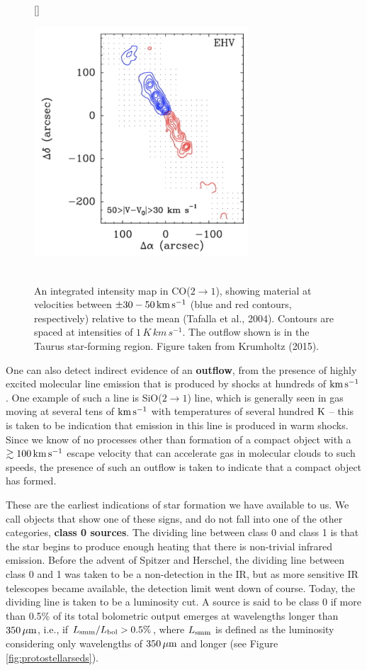 \documentclass[a4paper,10pt]{article}
\begin{document}
\begin{figure}[h]
    [\FBwidth]
    {\caption{\footnotesize{\\An integrated intensity map in CO($2\rightarrow1$), showing material at velocities between $\pm30-50\,{\rm km\,s^{-1}}$ (blue and red contours, respectively) relative to the mean (Tafalla et al., 2004). Contours are spaced at intensities of $1\,K\,km\,s^{-1}$. The outflow shown is in the Taurus star-forming region. Figure taken from Krumholtz (2015).}}
    \label{fig:outflows}}
    {\includegraphics[width=8cm]{figures/Outflows.png}}
\end{figure}

{\noindent}One can also detect indirect evidence of an \textbf{outflow}, from the presence of highly excited molecular line emission that is produced by shocks at hundreds of ${\rm km\,s^{-1}}$. One example of such a line is SiO($2\rightarrow1$) line, which is generally seen in gas moving at several tens of ${\rm km\,s^{-1}}$ with temperatures of several hundred ${\rm K}$ -- this is taken to be indication that emission in this line is produced in warm shocks. Since we know of no processes other than formation of a compact object with a $\gtrsim100\,{\rm km\,s^{-1}}$ escape velocity that can accelerate gas in molecular clouds to such speeds, the presence of such an outflow is taken to indicate that a compact object has formed.

{\noindent}These are the earliest indications of star formation we have available to us. We call objects that show one of these signs, and do not fall into one of the other categories, \textbf{class 0 sources}. The dividing line between class 0 and class 1 is that the star begins to produce enough heating that there is non-trivial infrared emission. Before the advent of Spitzer and Herschel, the dividing line between class 0 and 1 was taken to be a non-detection in the IR, but as more sensitive IR telescopes became available, the detection limit went down of course. Today, the dividing line is taken to be a luminosity cut. A source is said to be class 0 if more than 0.5\% of its total bolometric output emerges at wavelengths longer than $350\,\mu{\rm m}$, i.e., if $L_{\rm smm}/L_{\rm bol}>0.5\%$, where $L_{\rm smm}$ is defined as the luminosity considering only wavelengths of $350\,\mu{\rm m}$ and longer (see Figure \ref{fig:protostellarseds}).
\end{document}
